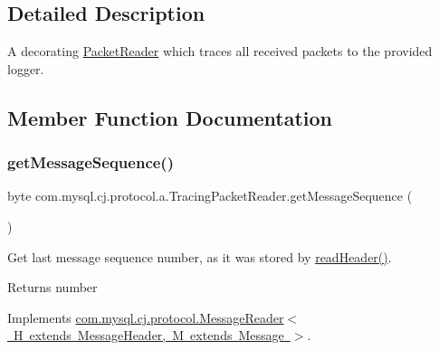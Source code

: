 \subsection{Detailed Description}
A decorating \mbox{\hyperlink{}{Packet\+Reader}} which traces all received packets to the provided logger. 

\subsection{Member Function Documentation}
\mbox{\label{classcom_1_1mysql_1_1cj_1_1protocol_1_1a_1_1_tracing_packet_reader_a35edadc0834493cc9536aa1c624c13ac}} 
\subsubsection{\texorpdfstring{get\+Message\+Sequence()}{getMessageSequence()}}
{\footnotesize\ttfamily byte com.\+mysql.\+cj.\+protocol.\+a.\+Tracing\+Packet\+Reader.\+get\+Message\+Sequence (\begin{DoxyParamCaption}{ }\end{DoxyParamCaption})}

Get last message sequence number, as it was stored by \mbox{\hyperlink{classcom_1_1mysql_1_1cj_1_1protocol_1_1a_1_1_tracing_packet_reader_a67550eb953a1d19c2ea8663e2336e2a3}{read\+Header()}}.

\begin{DoxyReturn}{Returns}
number 
\end{DoxyReturn}


Implements \mbox{\hyperlink{interfacecom_1_1mysql_1_1cj_1_1protocol_1_1_message_reader_ac4a36fb287c5308dd3d7e6157ef4e237}{com.\+mysql.\+cj.\+protocol.\+Message\+Reader$<$ H extends Message\+Header, M extends Message $>$}}.

\mbox{\label{classcom_1_1mysql_1_1cj_1_1protocol_1_1a_1_1_tracing_packet_reader_a67550eb953a1d19c2ea8663e2336e2a3}} 
